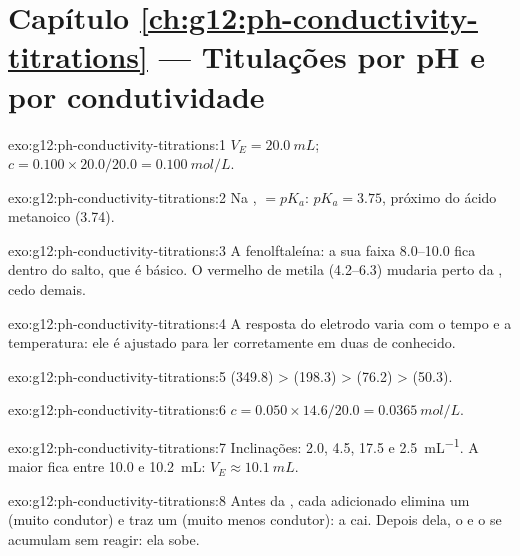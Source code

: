 \section*{Capítulo \ref{ch:g12:ph-conductivity-titrations} --- Titulações por pH e por condutividade}

\begin{solution}{exo:g12:ph-conductivity-titrations:1}
$V_E = \qty{20.0}{mL}$; $c = 0.100 \times 20.0 / 20.0 = \qty{0.100}{mol/L}$.
\end{solution}

\begin{solution}{exo:g12:ph-conductivity-titrations:2}
Na ,  $= pK_a$: $pK_a = 3.75$, próximo do ácido
metanoico (3.74).
\end{solution}

\begin{solution}{exo:g12:ph-conductivity-titrations:3}
A fenolftaleína: a sua faixa 8.0--10.0 fica dentro do salto, que é
básico. O vermelho de metila (4.2--6.3) mudaria perto da
, cedo demais.
\end{solution}

\begin{solution}{exo:g12:ph-conductivity-titrations:4}
A resposta do eletrodo varia com o tempo e a temperatura: ele é ajustado
para ler corretamente em duas  de  conhecido.
\end{solution}

\begin{solution}{exo:g12:ph-conductivity-titrations:5}
 (349.8) >  (198.3) >  (76.2) >  (50.3).
\end{solution}

\begin{solution}{exo:g12:ph-conductivity-titrations:6}
$c = 0.050 \times 14.6 / 20.0 = \qty{0.0365}{mol/L}$.
\end{solution}

\begin{solution}{exo:g12:ph-conductivity-titrations:7}
Inclinações: 2.0, 4.5, 17.5 e \qty{2.5}{mL^{-1}}. A maior fica entre
10.0 e \qty{10.2}{mL}: $V_E \approx \qty{10.1}{mL}$.
\end{solution}

\begin{solution}{exo:g12:ph-conductivity-titrations:8}
Antes da , cada  adicionado elimina um 
(muito condutor) e traz um  (muito menos condutor): a
 cai. Depois dela, o  e o  se acumulam sem
reagir: ela sobe.
\end{solution}

